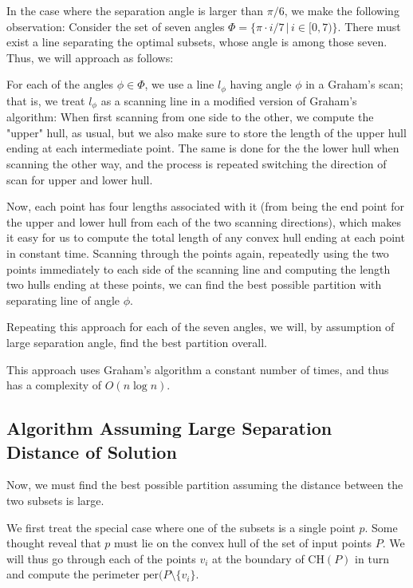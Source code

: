 \documentclass{article}
\begin{document}
In the case where the separation angle is larger than $\pi / 6$, we make the following observation: Consider the set of seven angles $\Phi = \{\pi \cdot i / 7 \,  | \, i \in [0, 7) \}$. There must exist a line separating the optimal subsets, whose angle is among those seven. Thus, we will approach as follows:

For each of the angles $\phi \in \Phi$, we use a line $l_\phi$ having angle $\phi$ in a Graham's scan; that is, we treat $l_\phi$ as a scanning line in a modified version of Graham's algorithm: When first scanning from one side to the other, we compute the "upper" hull, as usual, but we also make sure to store the length of the upper hull ending at each intermediate point. The same is done for the the lower hull when scanning the other way, and the process is repeated switching the direction of scan for upper and lower hull. 

Now, each point has four lengths associated with it (from being the end point for the upper and lower hull from each of the two scanning directions), which makes it easy for us to compute the total length of any convex hull ending at each point in constant time. Scanning through the points again, repeatedly using the two points immediately to each side of the scanning line and computing the length two hulls ending at these points, we can find the best possible partition with separating line of angle $\phi$.

Repeating this approach for each of the seven angles, we will, by assumption of large separation angle, find the best partition overall.

This approach uses Graham's algorithm a constant number of times, and thus has a complexity of $O(n \log n)$.

\subsection{Algorithm Assuming Large Separation Distance of Solution}

Now, we must find the best possible partition assuming the distance between the two subsets is large. 

We first treat the special case where one of the subsets is a single point $p$. Some thought reveal that $p$ must lie on the convex hull of the set of input points $P$. We will thus go through each of the points $v_i$ at the boundary of $\text{CH}(P)$ in turn and compute the perimeter $\text{per}(P \setminus \{v_i\}$. 
\end{document}
